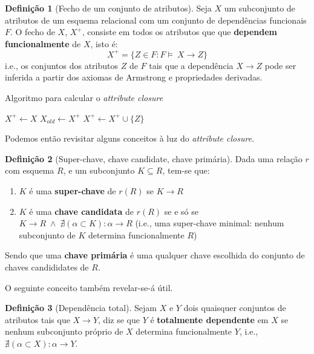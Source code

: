 \documentclass[oneside]{book}
\theoremstyle{definition}
\newtheorem{definition}{Definição}
\begin{document}
\begin{definition}[Fecho de um conjunto de atributos]
    Seja $X$ um subconjunto de atributos de um esquema relacional com um conjunto de dependências funcionais $F$. O fecho de $X$, $X^{+}$, consiste em todos os atributos que que \textbf{dependem funcionalmente} de $X$, isto é:
    \begin{equation*}
        X^{+} = \{ Z \in F: F \models \: X \rightarrow Z \}
    \end{equation*}
    i.e., os conjuntos dos atributos $Z$ de $F$ tais que a dependência $X \rightarrow Z$ pode ser inferida a partir dos axiomas de Armstrong e propriedades derivadas.
\end{definition}
\vspace{-0.3em}
\begin{algorithm}
    \caption{Algoritmo para calcular o \textit{attribute closure}}\label{alg:cap}
    \begin{algorithmic}
    \State $X^{+} \gets X$
    \Repeat
        \State $X_{old} \gets X^{+}$
                \State
                $X^{+} \gets  X^{+} \cup \{Z\}$
            \EndIf
        \EndFor
    \end{algorithmic}
 \end{algorithm}

Podemos então revisitar alguns conceitos à luz do \textit{attribute closure}.

\begin{definition} [Super-chave, chave candidate, chave primária]
    Dada uma relação $r$ com esquema $R$, e um subconjunto $K \subseteq R$, tem-se que:
    \begin{enumerate}
        \item $K$ é uma \textbf{super-chave} de $r(R)$ se $K \rightarrow R$
        \item $K$ é uma \textbf{chave candidata} de $r(R)$ se e só se  $K \rightarrow R \; \wedge \; \nexists(\alpha \subset K): \alpha \rightarrow R$ (i.e., uma super-chave minimal: nenhum subconjunto de $K$ determina funcionalmente $R$)
    \end{enumerate}
    Sendo que uma \textbf{chave primária} é uma qualquer chave escolhida do conjunto de chaves candididates de $R$.
\end{definition}

O seguinte conceito também revelar-se-á útil.

\begin{definition} [Dependência total]
    Sejam $X$ e $Y$ dois quaisquer conjuntos de atributos tais que $X \rightarrow Y$, diz se que $Y$ é \textbf{totalmente dependente} em $X$ se nenhum subconjunto próprio de $X$ determina funcionalmente $Y$, i.e., $\nexists(\alpha \subset X): \alpha \rightarrow Y$.
\end{definition}
\end{document}
